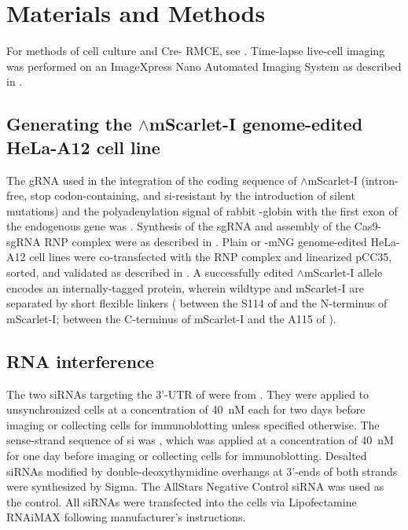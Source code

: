 \section{Materials and Methods}
For methods of cell culture and Cre- RMCE, see . Time-lapse live-cell imaging was performed on an ImageXpress Nano Automated Imaging System as described in .

\subsection{Generating the $\wedge$mScarlet-I genome-edited HeLa-A12 cell line}

The gRNA used in the integration of the coding sequence of $\wedge$mScarlet-I (intron-free, stop codon-containing, and si-resistant by the introduction of silent mutations) and the polyadenylation signal of rabbit \textbeta{}-globin with the first exon of the endogenous  gene 
was . Synthesis of the sgRNA and assembly of the Cas9-sgRNA RNP complex were as described in . Plain or -mNG genome-edited HeLa-A12 cell lines were co-transfected with the RNP complex and linearized pCC35, sorted, and validated as described in . A successfully edited $\wedge$mScarlet-I allele encodes an internally-tagged  protein, wherein wildtype  and mScarlet-I are separated by short flexible linkers ( between the S114 of  and the N-terminus of mScarlet-I;  between the C-terminus of mScarlet-I and the A115 of ).


\subsection{RNA interference}

The two siRNAs targeting the 3'-UTR of  were from \cite{siMAD1-3UTR}. They were applied to unsynchronized cells at a concentration of \SI{40}{nM} each for two days before imaging or collecting cells for immunoblotting unless specified otherwise. The sense-strand sequence of si was  \cite{BubR1MitosisTurnover}, which was applied at a concentration of \SI{40}{nM} for one day before imaging or collecting cells for immunoblotting. Desalted siRNAs modified by double-deoxythymidine overhangs at 3'-ends of both strands were synthesized by Sigma. The AllStars Negative Control siRNA was used as the control. All siRNAs were transfected into the cells via Lipofectamine RNAiMAX following manufacturer’s instructions.

